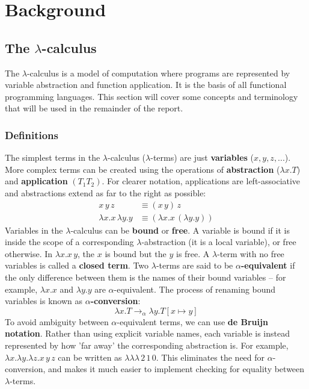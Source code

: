 \documentclass[11pt]{article}
\begin{document}
\newpage

\section{Background}
\label{sec:background}

\subsection{The \texorpdfstring{$\lambda$}{lambda}-calculus}
The $\lambda$-calculus is a model of computation where programs are represented by variable abstraction and function application. It is the basis of all functional programming languages. This section will cover some concepts and terminology that will be used in the remainder of the report.

\subsubsection{Definitions}
\label{sec:defs}

The simplest terms in the $\lambda$-calculus ($\lambda$-terms) are just \textbf{variables} ($x, y, z, ...$). More complex terms can be created using the operations of \textbf{abstraction} ($\lambda x. T$) and \textbf{application} $(T_1 T_2)$. For clearer notation, applications are left-associative and abstractions extend as far to the right as possible:
%
\begin{align*}
    x \, y \, z &\equiv (x \, y) \, z \\
    \lambda x. x \, \lambda y. y &\equiv (\lambda x. x \, (\lambda y. y))
\end{align*}
%
Variables in the $\lambda$-calculus can be \textbf{bound} or \textbf{free}. A variable is bound if it is inside the scope of a corresponding $\lambda$-abstraction (it is a local variable), or free otherwise. In $\lambda x. x \, y$, the $x$ is bound but the $y$ is free. A $\lambda$-term with no free variables is called a \textbf{closed term}. Two $\lambda$-terms are said to be \textbf{$\alpha$-equivalent} if the only difference between them is the names of their bound variables -- for example, $\lambda x. x$ and $\lambda y. y$ are $\alpha$-equivalent. The process of renaming bound variables is known as \textbf{$\alpha$-conversion}:
%
$$\lambda x. T \to_\alpha \lambda y. T[x \mapsto y]$$
%
To avoid ambiguity between $\alpha$-equivalent terms, we can use \textbf{de Bruijn notation}. Rather than using explicit variable names, each variable is instead represented by how 'far away' the corresponding abstraction is. For example, $\lambda x. \lambda y. \lambda z. x \, y \, z$ can be written as $\lambda\lambda\lambda \, 2 \, 1 \, 0$. This eliminates the need for $\alpha$-conversion, and makes it much easier to implement checking for equality between $\lambda$-terms.
\end{document}
